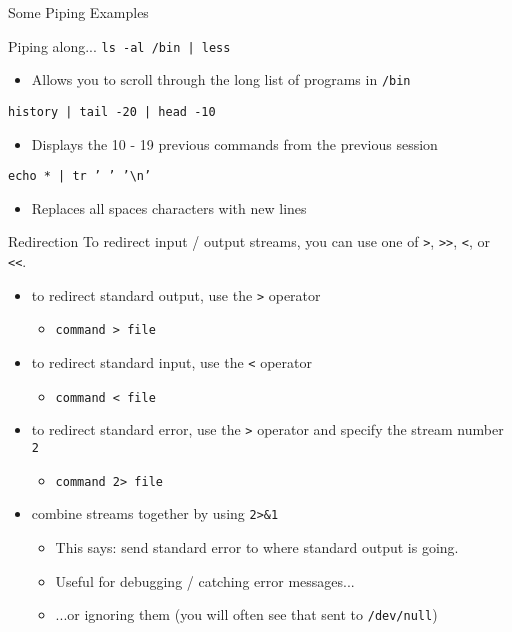 \begin{frame}[fragile]{Some Piping Examples}
  \begin{block}{Piping along...}
    \texttt{ls -al /bin | less}
    \begin{itemize}
      \item Allows you to scroll through the long list of programs in \texttt{/bin}
    \end{itemize}
    \texttt{history | tail -20 | head -10}
    \begin{itemize}
      \item Displays the 10 \-- 19 previous commands from the previous session
    \end{itemize}
    \texttt{echo * | tr ' ' '\textbackslash n'}
    \begin{itemize}
      \item Replaces all spaces characters with new lines
    \end{itemize}
  \end{block}
\end{frame}

\begin{frame}[fragile]{Redirection}
  To redirect input / output streams, you can use one of \texttt{>}, \texttt{>>}, \texttt{<}, or \texttt{<<}.
  \begin{itemize}[<+- | alert@+>]
    \item to redirect standard output, use the \texttt{>} operator
    \begin{itemize}[<+- | alert@+>]
      \item \texttt{command > file}
    \end{itemize}
    \item to redirect standard input, use the \texttt{<} operator
    \begin{itemize}[<+- | alert@+>]
      \item \texttt{command < file}
    \end{itemize}
    \item to redirect standard error, use the \texttt{>} operator and specify the stream number \texttt{2}
    \begin{itemize}[<+- | alert@+>]
      \item \texttt{command 2> file}
    \end{itemize}
    \item combine streams together by using \texttt{2>\&1}
    \begin{itemize}
      \item This says: send standard error to where standard output is going.
      \item Useful for debugging / catching error messages...
      \item ...or ignoring them (you will often see that sent to \texttt{/dev/null})
    \end{itemize}
  \end{itemize}
\end{frame}

